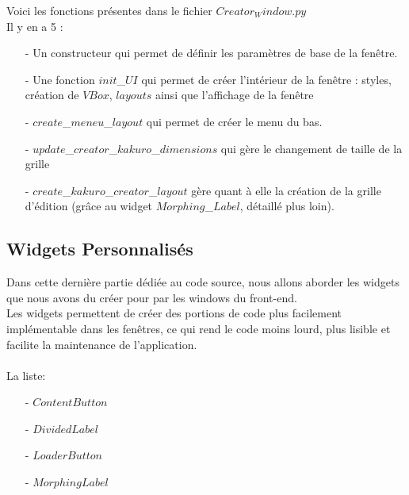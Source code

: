 \documentclass[french,12pt]{article}
\begin{document}
Voici les fonctions présentes dans le fichier $Creator_Window.py$ \\
Il y en a 5 : \\

\begin{enumerate}
	\item[-] Un constructeur qui permet de définir les paramètres de base de la fenêtre.
	\item[-] Une fonction $init$\_$UI$ qui permet de créer l'intérieur de la fenêtre : 			styles, création de $VBox$, $layouts$ ainsi que l'affichage de la fenêtre
	\item[-] $create$\_$meneu$\_$layout$ qui permet de créer le menu du bas.
	\item[-] $update$\_$creator$\_$kakuro$\_$dimensions$ qui gère le changement de taille 		de la grille
	\item[-] $create$\_$kakuro$\_$creator$\_$layout$ gère quant à elle la création de la grille d'édition (grâce au widget $Morphing$\_$Label$, détaillé plus loin).
\end{enumerate}
\newpage 



\subsection{Widgets Personnalisés}
Dans cette dernière partie dédiée au code source, nous allons aborder les widgets que nous avons du créer pour par les windows du front-end. \\
Les widgets permettent de créer des portions de code plus facilement implémentable dans les fenêtres, ce qui rend le code moins lourd, plus lisible et facilite la maintenance de l'application. \\ \\
 La liste: \\

\begin{enumerate}
	\item[-] $ContentButton$
	\item[-] $DividedLabel$
	\item[-] $LoaderButton$
	\item[-] $MorphingLabel$ \\
\end{enumerate}
\end{document}
